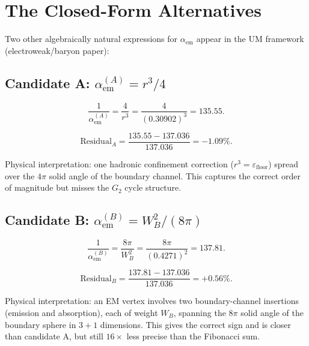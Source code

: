 \documentclass[12pt]{article}
\begin{document}
\section{The Closed-Form Alternatives}

Two other algebraically natural expressions for $\alpha_{\text{em}}$
appear in the UM framework (electroweak/baryon paper):

\subsection{Candidate A: $\alpha_{\text{em}}^{(A)} = r^3/4$}

\begin{equation}
  \frac{1}{\alpha_{\text{em}}^{(A)}} = \frac{4}{r^3}
  = \frac{4}{(0.30902)^3} = 135.55.
  \label{eq:alphaA}
\end{equation}

\begin{equation}
  \text{Residual}_A
  = \frac{135.55 - 137.036}{137.036} = -1.09\%.
\end{equation}

Physical interpretation: one hadronic confinement correction ($r^3 =
\varepsilon_{\text{floor}}$) spread over the $4\pi$ solid angle of
the boundary channel. This captures the correct order of magnitude but
misses the $G_2$ cycle structure.

\subsection{Candidate B: $\alpha_{\text{em}}^{(B)} = W_B^2/(8\pi)$}

\begin{equation}
  \frac{1}{\alpha_{\text{em}}^{(B)}} = \frac{8\pi}{W_B^2}
  = \frac{8\pi}{(0.4271)^2} = 137.81.
  \label{eq:alphaB}
\end{equation}

\begin{equation}
  \text{Residual}_B
  = \frac{137.81 - 137.036}{137.036} = +0.56\%.
\end{equation}

Physical interpretation: an EM vertex involves two boundary-channel
insertions (emission and absorption), each of weight $W_B$, spanning
the $8\pi$ solid angle of the boundary sphere in $3 + 1$ dimensions.
This gives the correct sign and is closer than candidate A, but still
$16\times$ less precise than the Fibonacci sum.
\end{document}
